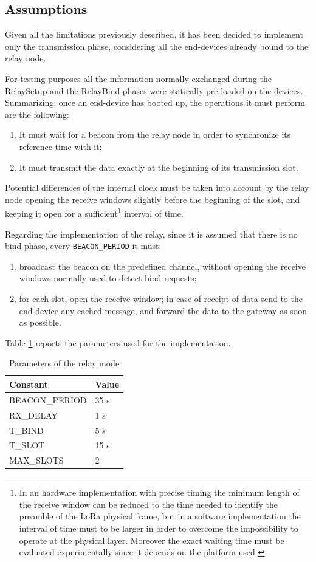 \subsection{Assumptions}
Given all the limitations previously described, it has been decided to implement only the transmission phase, considering all the end-devices already bound to the relay node.

For testing purposes all the information normally exchanged during the RelaySetup and the RelayBind phases were statically pre-loaded on the devices. Summarizing, once an end-device has booted up, the operations it must perform are the following:
\begin{enumerate}
\item It must wait for a beacon from the relay node in order to synchronize its reference time with it;
\item It must transmit the data exactly at the beginning of its transmission slot. 
\end{enumerate}
Potential differences of the internal clock must be taken into account by the relay node opening the receive windows slightly before the beginning of the slot, and keeping it open for a sufficient\footnote{In an hardware implementation with precise timing the minimum length of the receive window can be reduced to the time needed to identify the preamble of the LoRa physical frame, but in a software implementation the interval of time must to be larger in order to overcome the impossibility to operate at the physical layer. Moreover the exact waiting time must be evaluated experimentally since it depends on the platform used.} interval of time.

Regarding the implementation of the relay, since it is assumed that there is no bind phase, every \texttt{BEACON\_PERIOD} it must:
\begin{enumerate}
\item broadcast the beacon on the predefined channel, without opening the receive windows normally used to detect bind requests;
\item for each slot, open the receive window; in case of receipt of data send to the end-device any cached message, and forward  the data to the gateway as soon as possible.
\end{enumerate}
Table \ref{tab:relayparams} reports the parameters used for the implementation.

\begin{table}[]
\centering
\caption{Parameters of the relay mode}
\label{tab:relayparams}
\begin{tabular}{@{}ll@{}}
\toprule
Constant       & Value \\ \midrule
BEACON\_PERIOD & 35 s  \\
RX\_DELAY      & 1 s   \\
T\_BIND        & 5 s   \\
T\_SLOT        & 15 s  \\
MAX\_SLOTS     & 2     \\ \bottomrule
\end{tabular}
\end{table}


